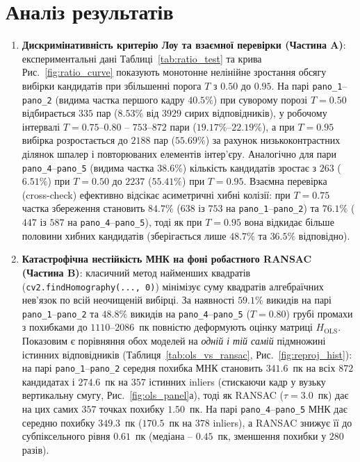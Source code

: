 \documentclass[14pt, a4paper]{extarticle}
\begin{document}
\newpage
\section{Аналіз результатів}
\begin{enumerate}
    \item \textbf{Дискримінативність критерію Лоу та взаємної перевірки (Частина A)}: експериментальні дані Таблиці~\ref{tab:ratio_test} та крива Рис.~\ref{fig:ratio_curve} показують монотонне нелінійне зростання обсягу вибірки кандидатів при збільшенні порога $T$ з $0.50$ до $0.95$. На парі \texttt{pano\_1}--\texttt{pano\_2} (видима частка першого кадру $40.5\%$) при суворому порозі $T=0.50$ відбирається $335$ пар ($8.53\%$ від $3929$ сирих відповідників), у робочому інтервалі $T=0.75$--$0.80$ -- $753$--$872$ пари ($19.17\%$--$22.19\%$), а при $T=0.95$ вибірка розростається до $2188$ пар ($55.69\%$) за рахунок низькоконтрастних ділянок шпалер і повторюваних елементів інтер'єру. Аналогічно для пари \texttt{pano\_4}--\texttt{pano\_5} (видима частка $38.6\%$) кількість кандидатів зростає з $263$ ($6.51\%$) при $T=0.50$ до $2237$ ($55.41\%$) при $T=0.95$. Взаємна перевірка (cross-check) ефективно відсікає асиметричні хибні колізії: при $T=0.75$ частка збереження становить $84.7\%$ ($638$ із $753$ на \texttt{pano\_1}--\texttt{pano\_2}) та $76.1\%$ ($447$ із $587$ на \texttt{pano\_4}--\texttt{pano\_5}), тоді як при $T=0.95$ вона відкидає більше половини хибних кандидатів (зберігається лише $48.7\%$ та $36.5\%$ відповідно).

    \item \textbf{Катастрофічна нестійкість МНК на фоні робастного RANSAC (Частина B)}: класичний метод найменших квадратів (\texttt{cv2.findHomography(..., 0)}) мінімізує суму квадратів алгебраїчних нев'язок по всій неочищеній вибірці. За наявності $59.1\%$ викидів на парі \texttt{pano\_1}--\texttt{pano\_2} та $48.8\%$ викидів на \texttt{pano\_4}--\texttt{pano\_5} ($T=0.80$) грубі промахи з похибками до $1110$--$2086$~пк повністю деформують оцінку матриці $H_{\text{OLS}}$. Показовим є порівняння обох моделей на \textit{одній і тій самій} підмножині істинних відповідників (Таблиця~\ref{tab:ols_vs_ransac}, Рис.~\ref{fig:reproj_hist}): на парі \texttt{pano\_1}--\texttt{pano\_2} середня похибка МНК становить $\mathbf{341.6}$~пк на всіх $872$ кандидатах і $\mathbf{274.6}$~пк на $357$ істинних inliers (стискаючи кадр у вузьку вертикальну смугу, Рис.~\ref{fig:ols_panel}а), тоді як RANSAC ($\tau=3.0$~пк) дає на цих самих $357$ точках похибку $\mathbf{1.50}$~пк. На парі \texttt{pano\_4}--\texttt{pano\_5} МНК дає середню похибку $\mathbf{349.3}$~пк ($\mathbf{170.5}$~пк на $378$ inliers), а RANSAC знижує її до субпіксельного рівня $\mathbf{0.61}$~пк (медіана -- $0.45$~пк, зменшення похибки у $280$ разів).


\end{enumerate}
\end{document}
